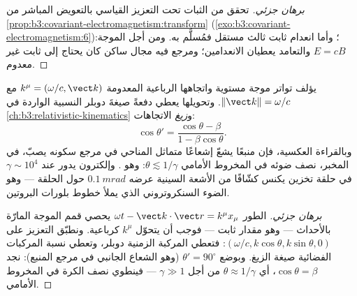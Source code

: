\begin{proof}[برهان جزئي]
تحقق من الثبات تحت التعزيز القياسي بالتعويض المباشر من
\cref{prop:b3:covariant-electromagnetism:transform}
(\cref{exo:b3:covariant-electromagnetism:6})؛ وأما انعدام ثابت
ثالث مستقل فمُسلَّم به. ومن أجل الموجة: $E = cB$
والتعامد يعطيان الانعدامين؛ ومرجع فيه مجال ساكن كان يحتاج إلى
ثابت غير معدوم.
\end{proof}

\begin{proposition}\label{prop:b3:covariant-electromagnetism:wavevector}
يؤلف تواتر موجة مستوية واتجاهها الرباعية المعدومة
$k^\mu = (\omega/c, \vect k)$ مع $\|\vect k\| = \omega/c$. وتحويلها
يعطي دفعةً صيغةَ دوبلر النسبية الواردة في
\cref{ch:b3:relativistic-kinematics} و\emph{زيغ} الاتجاهات:
\[
\cos\theta' = \frac{\cos\theta - \beta}{1 - \beta\cos\theta} .
\]
وبالقراءة العكسية، فإن منبعًا يشعّ إشعاعًا متماثل المناحي في
مرجع سكونه يصبّ، في المخبر، نصف ضوئه في المخروط الأمامي $\theta
\lesssim 1/\gamma$: وهو \emph{}. وإلكترون يدور
عند $\gamma \sim 10^4$ في حلقة تخزين يكنس
كشّافًا من الأشعة السينية عرضه $\qty{0.1}{mrad}$ حول الحلقة --- وهو
الضوء السنكروتروني الذي يملأ خطوط بلورات البروتين.
\end{proposition}

\begin{proof}[برهان جزئي]
الطور $\omega t - \vect k\cdot\vect r = k^\mu x_\mu$ يحصي قمم
الموجة المارّة بالأحداث --- وهو مقدار ثابت --- فوجب أن يتحوّل $k^\mu$
كرباعية. ونطبّق التعزيز على $(\omega/c, k\cos\theta,
k\sin\theta, 0)$: فتعطي المركبة الزمنية دوبلر، وتعطي نسبة
المركبات الفضائية صيغة الزيغ. وبوضع $\theta' =
90^\circ$ (وهو الشعاع الجانبي في مرجع المنبع): نجد $\cos\theta =
\beta$، أي $\theta \approx 1/\gamma$ من أجل $\gamma \gg 1$ --- فينطوي
نصف الكرة في المخروط الأمامي.
\end{proof}


